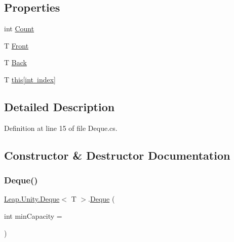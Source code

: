 \subsection*{Properties}
\begin{DoxyCompactItemize}
\item 
int \mbox{\hyperlink{class_leap_1_1_unity_1_1_deque_a045ee07203842538f5ba78cccd758e04}{Count}}
\item 
T \mbox{\hyperlink{class_leap_1_1_unity_1_1_deque_a11098175933b4b40fe5304b6f3cf3f67}{Front}}
\item 
T \mbox{\hyperlink{class_leap_1_1_unity_1_1_deque_ad0f1295eca862d9e37d3a49fccf4ea72}{Back}}
\item 
T \mbox{\hyperlink{class_leap_1_1_unity_1_1_deque_ac6ec12e1519aa5105be2972d19472f3a}{this\mbox{[}int index\mbox{]}}}
\end{DoxyCompactItemize}


\subsection{Detailed Description}


Definition at line 15 of file Deque.\+cs.



\subsection{Constructor \& Destructor Documentation}
\mbox{\label{class_leap_1_1_unity_1_1_deque_af2f33588f51a6337080c2daf710c5a59}} 
\subsubsection{\texorpdfstring{Deque()}{Deque()}}
{\footnotesize\ttfamily \mbox{\hyperlink{class_leap_1_1_unity_1_1_deque}{Leap.\+Unity.\+Deque}}$<$ T $>$.\mbox{\hyperlink{class_leap_1_1_unity_1_1_deque}{Deque}} (\begin{DoxyParamCaption}\item[{int}]{min\+Capacity = {} }\end{DoxyParamCaption})}



